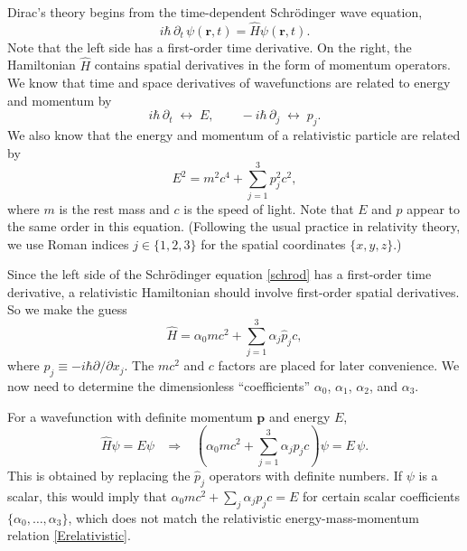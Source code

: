\documentclass[prx,12pt]{revtex4-2}
\begin{document}
Dirac's theory begins from the time-dependent Schr\"odinger wave
equation,
\begin{equation}
  i\hbar\, \partial_t\, \psi(\mathbf{r},t)
  = \hat{H} \psi(\mathbf{r},t).
  \label{schrod}
\end{equation}
Note that the left side has a first-order time derivative.  On the
right, the Hamiltonian $\hat{H}$ contains spatial derivatives in the
form of momentum operators.  We know that time and space derivatives
of wavefunctions are related to energy and momentum by
\begin{equation}
    i\hbar\, \partial_t\; \leftrightarrow \;
    E, \qquad
    -i\hbar\, \partial_j \;\leftrightarrow \;
    p_j.
\end{equation}
We also know that the energy and momentum of a relativistic particle
are related by
\begin{equation}
  E^2 = m^2c^4 + \sum_{j=1}^3 p_j^2c^2,
  \label{Erelativistic}
\end{equation}
where $m$ is the rest mass and $c$ is the speed of light.  Note that
$E$ and $p$ appear to the same order in this equation.  (Following the
usual practice in relativity theory, we use Roman indices $j \in
\{1,2,3\}$ for the spatial coordinates $\{x,y,z\}$.)

Since the left side of the Schr\"odinger equation \eqref{schrod} has a
first-order time derivative, a relativistic Hamiltonian should involve
first-order spatial derivatives.  So we make the guess
\begin{equation}
  \hat{H} = \alpha_0 mc^2 + \sum_{j=1}^3 \alpha_j \hat{p}_j c,
  \label{Dirac0}
\end{equation}
where $\hat{p}_j \equiv -i\hbar \partial/\partial x_j$.  The $mc^2$
and $c$ factors are placed for later convenience.  We now need to
determine the dimensionless ``coefficients'' $\alpha_0$, $\alpha_1$,
$\alpha_2$, and $\alpha_3$.

For a wavefunction with definite momentum $\mathbf{p}$ and energy
$E$,
\begin{equation}
  \hat{H}\psi = E \psi \;\;\;\Rightarrow \;\;\;
  \left(\alpha_0mc^2 + \sum_{j=1}^3\alpha_j p_jc\right) \psi = E\,\psi.
\end{equation}
This is obtained by replacing the $\hat{p}_j$ operators with definite
numbers.  If $\psi$ is a scalar, this would imply that $\alpha_0 mc^2
+ \sum_{j}\alpha_j p_j c = E$ for certain scalar coefficients
$\{\alpha_0, \dots, \alpha_3\}$, which does not match the relativistic
energy-mass-momentum relation \eqref{Erelativistic}.
\end{document}
